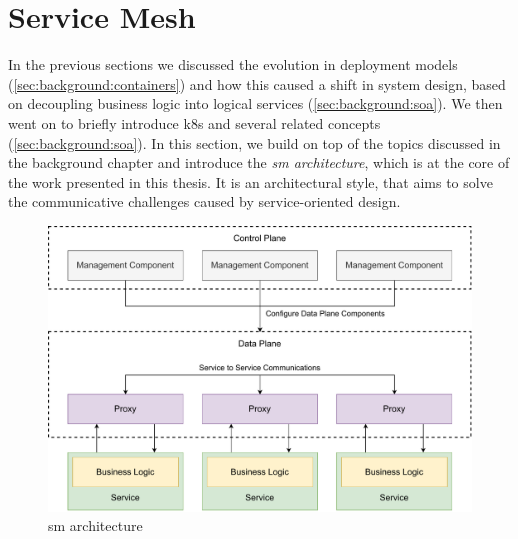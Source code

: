 \section{Service Mesh}
\label{sec:background:service-mesh}

In the previous sections we discussed the evolution in deployment models (\cref{sec:background:containers}) and how this caused a shift in system design, based on decoupling business logic into logical services (\cref{sec:background:soa}). We then went on to briefly introduce \gls{k8s} and several related concepts (\cref{sec:background:soa}). In this section, we build on top of the topics discussed in the background chapter and introduce the \textit{\gls{sm} architecture}, which is at the core of the work presented in this thesis. It is an architectural style, that aims to solve the communicative challenges caused by service-oriented design.



\begin{figure}[!t]
    \centering
    
    \includegraphics[width=\linewidth]{2_background/figures/service-mesh-architecture.pdf}

    \caption[Service Mesh Architecture]{\Gls{sm} architecture}
    \label{fig:service-mesh-architecture}
\end{figure}

